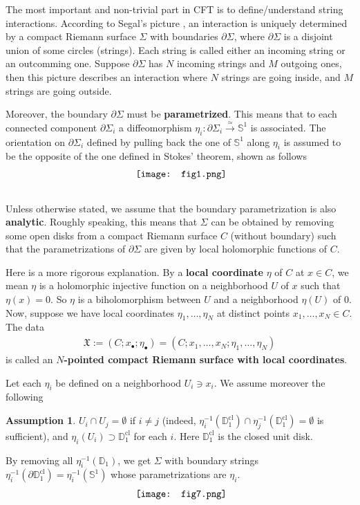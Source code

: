 \documentclass[11pt,b5paper,notitlepage]{article}
\theoremstyle{definition}
\newtheorem{ass}[df]{Assumption}
\theoremstyle{plain}
\newcommand{\fk}{\mathfrak}
\newcommand{\blt}{\bullet}
\newcommand{\Dbb}{\mathbb D}
\newcommand{\Sbb}{{\mathbb S}}
\newcommand{\cl}{\mathrm{cl}}
\numberwithin{equation}{section}
\begin{document}
The most important and non-trivial part in CFT is to define/understand string interactions. According to Segal's picture \cite{Seg88}, an interaction is uniquely determined by a compact Riemann surface $\Sigma$ with boundaries $\partial\Sigma$, where $\partial\Sigma$ is a disjoint union of some circles (strings). Each string is called either an incoming string or an outcomming one. Suppose $\partial\Sigma$ has $N$ incoming strings and $M$ outgoing ones, then this picture describes an interaction where $N$ strings are going inside, and $M$ strings are going outside. 

Moreover, the boundary $\partial\Sigma$ must be \textbf{parametrized}. This means that to each connected component $\partial\Sigma_i$ a diffeomorphism $\eta_i:\partial\Sigma_i\xrightarrow{\simeq}\Sbb^1$ is associated. The orientation on $\partial\Sigma_i$ defined by pulling back the one of $\Sbb^1$ along $\eta_i$ is assumed to be the opposite of the one defined in Stokes' theorem, shown as follows
\begin{align}
	\vcenter{\hbox{{
				\texttt{[image: fig1.png]}}}}\label{fig1}
\end{align}


\subsection{}\label{lb17}

Unless otherwise stated, we assume that the boundary parametrization is also \textbf{analytic}. Roughly speaking, this means that $\Sigma$ can be obtained by removing some open  disks from a compact Riemann surface $C$ (without boundary) such that the parametrizations of $\partial\Sigma$ are given by local holomorphic functions of $C$. 

Here is a more rigorous explanation. By a \textbf{local coordinate} $\eta$ of $C$ at $x\in C$, we mean $\eta$ is a holomorphic injective function  on a neighborhood $U$ of $x$ such that $\eta(x)=0$. So $\eta$ is a biholomorphism between $U$ and a neighborhood $\eta(U)$ of $0$. Now, suppose we have local coordinates $\eta_1,\dots,\eta_N$ at distinct points $x_1,\dots,x_N\in C$. The data
\begin{align}
\fk X:=(C;x_\blt;\eta_\blt)=(C;x_1,\dots,x_N;\eta_1,\dots,\eta_N)	
\end{align}
is called an \textbf{$N$-pointed compact Riemann surface with local coordinates}. 

Let each $\eta_i$ be defined on a neighborhood $U_i\ni x_i$. We assume moreover the following
\begin{ass}\label{lb11}
$U_i\cap U_j=\emptyset$ if $i\neq j$ (indeed, $\eta_i^{-1}(\Dbb_1^\cl)\cap \eta_j^{-1}(\Dbb_1^\cl)=\emptyset$ is sufficient), and $\eta_i(U_i)\supset\Dbb_1^\cl$ for each $i$. Here $\Dbb_1^\cl$ is the closed unit  disk.
\end{ass} 
By removing all $\eta_i^{-1}(\Dbb_1)$, we get $\Sigma$ with boundary strings $\eta_i^{-1}(\partial\Dbb_1^\cl)=\eta_i^{-1}(\Sbb^1)$ whose parametrizations are $\eta_i$.
\begin{align*}
	\vcenter{\hbox{{
				\texttt{[image: fig7.png]}}}}
\end{align*}
\end{document}
